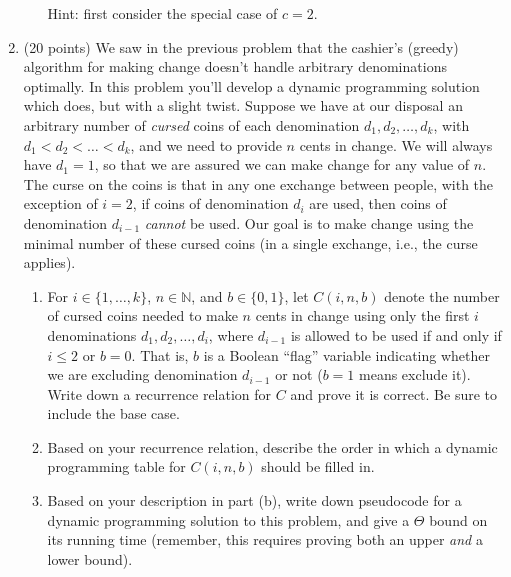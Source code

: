 \documentclass[12pt]{article}
\begin{document}
\begin{enumerate}
\begin{enumerate}
	Hint: first consider the special case of $c=2$.

	\end{enumerate}
    
    \item (20 points) We saw in the previous problem that the cashier's (greedy) algorithm for making change doesn't handle arbitrary denominations optimally. In this problem you'll develop a dynamic programming solution which does, but with a slight twist. Suppose we have at our disposal an arbitrary number of \emph{cursed} coins of each denomination $d_1, d_2, \dotsc, d_k$, with $d_1 < d_2 < \dotsc < d_k$, and we need to provide $n$ cents in change. We will always have $d_1=1$, so that we are assured we can make change for any value of $n$. The curse on the coins is that in any one exchange between people, with the exception of $i=2$, if coins of denomination $d_i$ are used, then coins of denomination $d_{i-1}$ \emph{cannot} be used. Our goal is to make change using the minimal number of these cursed coins (in a single exchange, i.e., the curse applies).

    \begin{enumerate}
    	\item For $i \in \{1,\dotsc,k\}$, $n \in \mathbb{N}$, and $b \in \{0,1\}$, let $C(i,n,b)$ denote the number of cursed coins needed to make $n$ cents in change using only the first $i$ denominations $d_1, d_2, \dotsc, d_i$, where $d_{i-1}$ is allowed to be used if and only if $i \leq 2$ or $b=0$. That is, $b$ is a Boolean ``flag'' variable indicating whether we are excluding denomination $d_{i-1}$ or not ($b=1$ means exclude it). 	
    	Write down a recurrence relation for $C$ and prove it is correct. Be sure to include the base case.
    	\item Based on your recurrence relation, describe the order in which a dynamic programming table for $C(i,n,b)$ should be filled in.
    	
    	\item Based on your description in part (b), write down pseudocode for a dynamic programming solution to this problem, and give a $\Theta$ bound on its running time (remember, this requires proving both an upper \emph{and} a lower bound).
    \end{enumerate}

\end{enumerate}
\end{document}
